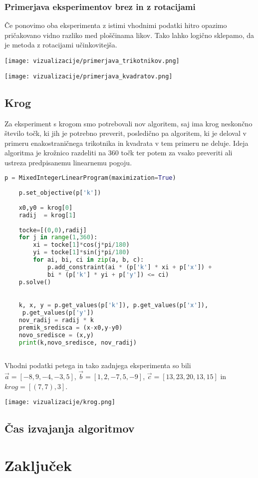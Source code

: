 \documentclass[a4paper, 12pt]{article}
\begin{document}
\subsubsection{Primerjava eksperimentov brez in z rotacijami}
Če ponovimo oba eksperimenta z istimi vhodnimi podatki hitro opazimo pričakovano vidno razliko med ploščinama likov.
Tako lahko logično sklepamo, da je metoda z rotacijami učinkovitejša. 
\begin{center}
    \texttt{[image: vizualizacije/primerjava\_trikotnikov.png]}\\
\end{center}
\begin{center}
    \texttt{[image: vizualizacije/primerjava\_kvadratov.png]}\\
\end{center}


\subsection{Krog}
Za eksperiment s krogom smo potrebovali nov algoritem, saj ima krog neskončno število točk, ki jih je potrebno preverit,
posledično pa algoritem, ki je 
deloval v primeru enakostraničnega trikotnika in kvadrata v tem primeru ne deluje. Ideja algoritma je krožnico razdeliti na $360$ točk ter potem za vsako
preveriti ali ustreza predpisanemu linearnemu pogoju. 
\begin{lstlisting}[language=Python]
    p = MixedIntegerLinearProgram(maximization=True)
    
    p.set_objective(p['k'])
    
    x0,y0 = krog[0]
    radij  = krog[1]
    
    tocke=[(0,0),radij]
    for j in range(1,360):
        xi = tocke[1]*cos(j*pi/180)
        yi = tocke[1]*sin(j*pi/180)
        for ai, bi, ci in zip(a, b, c):
            p.add_constraint(ai * (p['k'] * xi + p['x']) + 
            bi * (p['k'] * yi + p['y']) <= ci)
    p.solve()
    

    k, x, y = p.get_values(p['k']), p.get_values(p['x']),
     p.get_values(p['y'])
    nov_radij = radij * k
    premik_sredisca = (x-x0,y-y0)
    novo_sredisce = (x,y)
    print(k,novo_sredisce, nov_radij)
    
\end{lstlisting}
Vhodni podatki petega in tako zadnjega eksperimenta so bili $\vec{a}=[-8,9,-4,-3,5]$, $\vec{b}=[1,2,-7,5,-9]$, $\vec{c}=[13,23,20,13,15]$ in $krog=[(7,7),3]$.
\begin{center}
    \texttt{[image: vizualizacije/krog.png]}\\
\end{center}
\subsection{Čas izvajanja algoritmov}
\newpage
\section{Zaključek}
\end{document}
